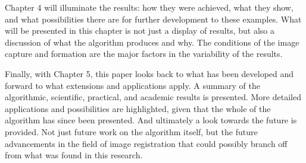 Chapter 4 will illuminate the results: how they were achieved, what they show, and what possibilities there are for further development to these examples. What will be presented in this chapter is not just a display of results, but also a discussion of what the algorithm produces and why. The conditions of the image capture and formation are the major factors in the variability of the results.

Finally, with Chapter 5, this paper looks back to what has been developed and forward to what extensions and applications apply. A summary of the algorithmic, scientific, practical, and academic results is presented. More detailed applications and possibilities are highlighted, given that the whole of the algorithm has since been presented. And ultimately a look towards the future is provided. Not just future work on the algorithm itself, but the future advancements in the field of image registration that could possibly branch off from what was found in this research.




